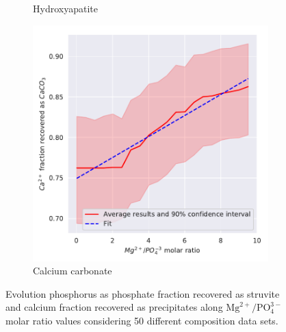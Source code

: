 \documentclass[10pt,a4paper]{article}
\begin{document}
\begin{figure}[H]
\begin{subfigure}[t]{0.32\textheight}
		\caption{Hydroxyapatite}
		\label{fig:Mg_influence_HAP}
	\end{subfigure} 
	\begin{subfigure}[t]{0.32\textheight}
		\includegraphics[width=\textwidth]{x_plotCaCO3Yield_Mg}
		\caption{Calcium carbonate}
		\label{fig:Mg_influence_CaCO3}
	\end{subfigure}
	
	\caption{Evolution phosphorus as phosphate fraction recovered as struvite and calcium fraction recovered as precipitates along $\text{Mg}^{2+}/\text{PO}_{4}^{3-}$ molar ratio values considering 50 different composition data sets.}
	\label{fig:estimation_Mg_ca}
\end{figure}
\end{document}
